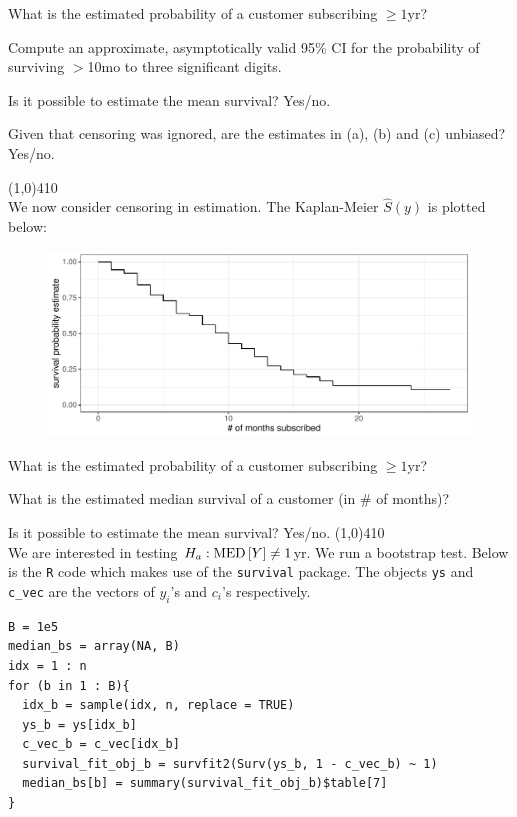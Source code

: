 \documentclass[12pt]{article}
\begin{document}
\begin{enumerate}[(a)]

 What is the estimated probability of a customer subscribing $\geq 1$yr?


 Compute an approximate, asymptotically valid 95\% CI for the probability of surviving $>$10mo to three significant digits. %


 Is it possible to estimate the mean survival? Yes/no.

 Given that censoring was ignored, are the estimates in (a), (b) and (c) unbiased? Yes/no.

 \line(1,0){410} \\
We now consider censoring in estimation. The Kaplan-Meier $\hat{S}(y)$ is plotted below:

\begin{figure}[htp]
\centering
\includegraphics[width=5.5in]{survival_with_censoring}
\end{figure}

 What is the estimated probability of a customer subscribing $\geq 1$yr?

 What is the estimated median survival of a customer (in \# of months)?

 Is it possible to estimate the mean survival? Yes/no.
 \line(1,0){410} \\
We are interested in testing $H_a: \text{MED}\left[Y\right] \neq 1$yr. We run a bootstrap test. Below is the \texttt{R} code which makes use of the \texttt{survival} package. The objects \texttt{ys} and \texttt{c\_vec} are the vectors of $y_i$'s and $c_i$'s respectively.

\footnotesize
\begin{verbatim}
B = 1e5
median_bs = array(NA, B)
idx = 1 : n
for (b in 1 : B){
  idx_b = sample(idx, n, replace = TRUE)
  ys_b = ys[idx_b]
  c_vec_b = c_vec[idx_b]
  survival_fit_obj_b = survfit2(Surv(ys_b, 1 - c_vec_b) ~ 1) 
  median_bs[b] = summary(survival_fit_obj_b)$table[7]  
}
\end{verbatim}
\normalsize



\end{enumerate}
\end{document}
